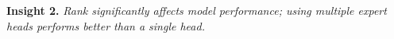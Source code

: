 \documentclass{article} %
\begin{document}



\textbf{Insight 2.} \textit{Rank significantly affects model performance; using multiple expert heads performs better than a single head.}


\end{document}
